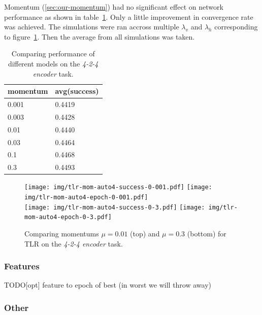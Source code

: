 Momentum (\ref{sec:our-momentum}) had no significant effect on network performance as shown in table~\ref{tab:results-mom-auto4}. Only a little improvement in convergence rate was achieved. The simulations were ran accross multiple $\lambda_v$ and $\lambda_h$ corresponding to figure~\ref{fig:results-tlr-auto4-momentum}. Then the average from all simulations was taken. 
\begin{table}[H] 
  \centering
  {\small
    \begin{tabular}{|l|l|}
    \hline
momentum & avg(success) \\
    \hline
0.001  & 0.4419 \\
    \hline
0.003  & 0.4428 \\
    \hline
0.01   & 0.4440 \\
    \hline
0.03   & 0.4464 \\
    \hline
0.1    & 0.4468 \\
    \hline
0.3    & 0.4493 \\
    \hline
    \end{tabular}
  }
  \caption{Comparing performance of different models on the \emph{4-2-4 encoder} task.} 
  \label{tab:results-mom-auto4}
\end{table}


\begin{figure}[H]
  \centering
  \texttt{[image: img/tlr-mom-auto4-success-0-001.pdf]}  
  \texttt{[image: img/tlr-mom-auto4-epoch-0-001.pdf]}  \\
  \texttt{[image: img/tlr-mom-auto4-success-0-3.pdf]}  
  \texttt{[image: img/tlr-mom-auto4-epoch-0-3.pdf]}  
  \caption{Comparing momentums $\mu=0.01$ (top) and $\mu=0.3$ (bottom) for TLR on the \emph{4-2-4 encoder} task.}
  \label{fig:results-tlr-auto4-momentum}
\end{figure}


\subsubsection{Features}

\label{sec:results-auto4-bal-matrix-sim}
\label{fig:results-candidates-dist-h-fb} 
TODO[opt] feature to epoch of best (in worst we will throw away) 

\subsubsection{Other} 


